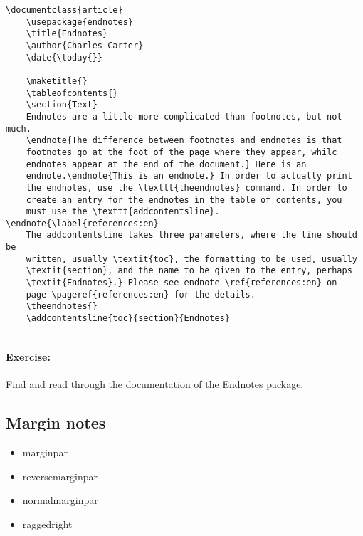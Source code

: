         \begin{verbatim}
\documentclass{article}
    \usepackage{endnotes}
    \title{Endnotes}
    \author{Charles Carter}
    \date{\today{}}
 
    \maketitle{}
    \tableofcontents{}
    \section{Text}
    Endnotes are a little more complicated than footnotes, but not much.
    \endnote{The difference between footnotes and endnotes is that 
    footnotes go at the foot of the page where they appear, whilc 
    endnotes appear at the end of the document.} Here is an 
    endnote.\endnote{This is an endnote.} In order to actually print 
    the endnotes, use the \texttt{theendnotes} command. In order to 
    create an entry for the endnotes in the table of contents, you 
    must use the \texttt{addcontentsline}.  \endnote{\label{references:en}
    The addcontentsline takes three parameters, where the line should be 
    written, usually \textit{toc}, the formatting to be used, usually 
    \textit{section}, and the name to be given to the entry, perhaps 
    \textit{Endnotes}.} Please see endnote \ref{references:en} on 
    page \pageref{references:en} for the details.
    \theendnotes{}
    \addcontentsline{toc}{section}{Endnotes}
    
        \end{verbatim}

        \paragraph{Exercise:} Find and read through the documentation of the Endnotes package.

    \subsection{Margin notes}
    \label{Margin notes}

        \begin{cmd}
            \begin{itemize}
                \item{marginpar}
                \item{reversemarginpar}
                \item{normalmarginpar}
                \item{raggedright}
            \end{itemize}
        \end{cmd}

